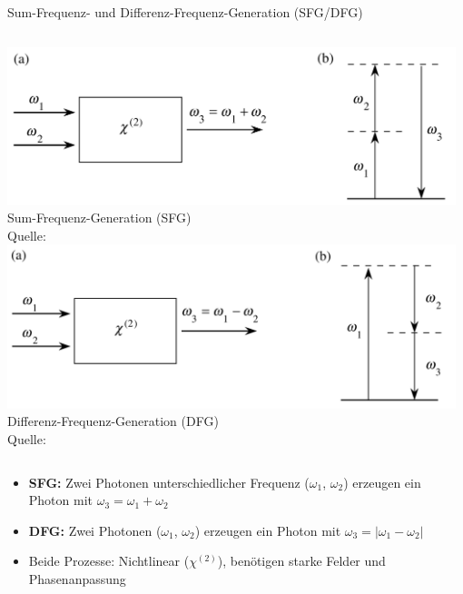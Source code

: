 \documentclass[aspectratio=169]{beamer} %
\newcommand{\figcite}[1]{\\[-3mm]{\tiny Quelle: \cite{#1}}}
\begin{document}
\begin{frame}[noframenumbering]{Sum-Frequenz- und Differenz-Frequenz-Generation (SFG/DFG)}
  \begin{columns}[T,onlytextwidth]
      \includegraphics[width=0.98\textwidth]{Images/sum-freq.png}\\[-1mm]{\tiny Sum-Frequenz-Generation (SFG) \figcite{Boyd2020}}
      \includegraphics[width=0.98\textwidth]{Images/diff-freq.png}\\[-1mm]{\tiny Differenz-Frequenz-Generation (DFG) \figcite{Boyd2020}}
  \end{columns}
  \vspace{0.2cm}
  \begin{itemize}
    \item \textbf{SFG:} Zwei Photonen unterschiedlicher Frequenz ($\omega_1$, $\omega_2$) erzeugen ein Photon mit $\omega_3 = \omega_1 + \omega_2$
    \item \textbf{DFG:} Zwei Photonen ($\omega_1$, $\omega_2$) erzeugen ein Photon mit $\omega_3 = |\omega_1 - \omega_2|$
    \item Beide Prozesse: Nichtlinear ($\chi^{(2)}$), benötigen starke Felder und Phasenanpassung
  \end{itemize}
\end{frame}
\end{document}

